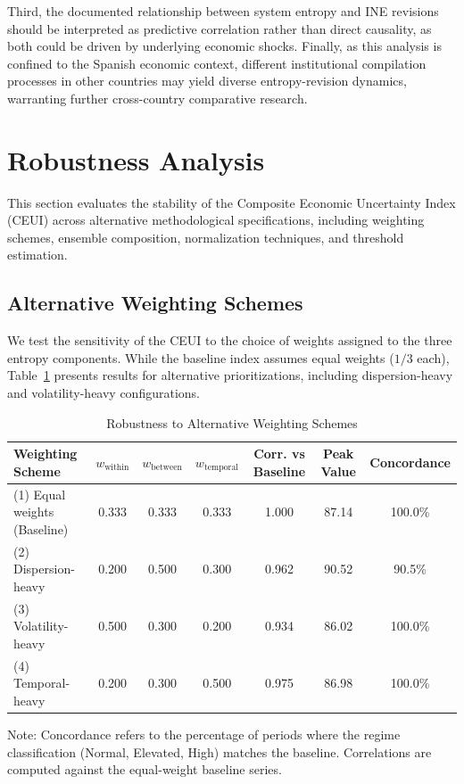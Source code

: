 \documentclass[12pt,a4paper]{article}
\theoremstyle{remark}
\begin{document}
Third, the documented relationship between system entropy and INE revisions
 should be interpreted as predictive correlation rather than direct causality, as both could be driven by underlying economic shocks. Finally, as this analysis is confined to the Spanish economic context, different institutional compilation processes in other countries may yield diverse entropy-revision dynamics, warranting further cross-country comparative research.

\section{Robustness Analysis}

This section evaluates the stability of the Composite Economic Uncertainty Index (CEUI) across alternative methodological specifications, including weighting schemes, ensemble composition, normalization techniques, and threshold estimation.

\subsection{Alternative Weighting Schemes}

We test the sensitivity of the CEUI to the choice of weights assigned to the three entropy components. While the baseline index assumes equal weights ($1/3$ each), Table~\ref{tab:robustness_weights} presents results for alternative prioritizations, including dispersion-heavy and volatility-heavy configurations.

\begin{table}[h]
\centering
\begin{threeparttable}
\caption{Robustness to Alternative Weighting Schemes}
\label{tab:robustness_weights}
\footnotesize
\begin{tabular}{lcccccc}
\toprule
Weighting Scheme & $w_{\text{within}}$ & $w_{\text{between}}$ & $w_{\text{temporal}}$ & Corr. vs Baseline & Peak Value & Concordance \\
\midrule
(1) Equal weights (Baseline) & 0.333 & 0.333 & 0.333 & 1.000 & 87.14 & 100.0\% \\
(2) Dispersion-heavy & 0.200 & 0.500 & 0.300 & 0.962 & 90.52 & 90.5\% \\
(3) Volatility-heavy & 0.500 & 0.300 & 0.200 & 0.934 & 86.02 & 100.0\% \\
(4) Temporal-heavy & 0.200 & 0.300 & 0.500 & 0.975 & 86.98 & 100.0\% \\
\bottomrule
\end{tabular}
\begin{tablenotes}
  \small \item Note: Concordance refers to the percentage of periods where the regime classification (Normal, Elevated, High) matches the baseline. Correlations are computed against the equal-weight baseline series.
\end{tablenotes}
\end{threeparttable}
\end{table}
\end{document}
